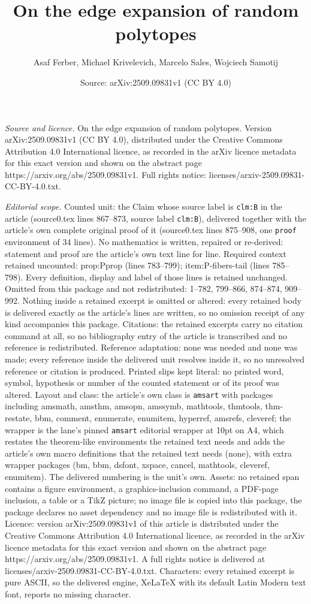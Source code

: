 \documentclass[10pt,a4paper]{amsart}
\title[On the edge expansion of random polytopes]{On the edge expansion of random polytopes}
\author{Asaf Ferber, Michael Krivelevich, Marcelo Sales, Wojciech Samotij}
\date{Source: arXiv:2509.09831v1 (CC BY 4.0)}
\begin{document}
\maketitle

\noindent\emph{Source and licence.} On the edge expansion of random polytopes. Version arXiv:2509.09831v1 (CC BY 4.0), distributed under the Creative Commons Attribution 4.0 International licence, as recorded in the arXiv licence metadata for this exact version and shown on the abstract page https://arxiv.org/abs/2509.09831v1. Full rights notice: licenses/arxiv-2509.09831-CC-BY-4.0.txt.\par\smallskip

\noindent\textit{Editorial scope.} Counted unit: the Claim whose source label is \texttt{clm:B} in the article (source0.tex lines 867--873, source label \texttt{clm:B}), delivered together with the article's own complete original proof of it (source0.tex lines 875--908, one \texttt{proof} environment of 34 lines). No mathematics is written, repaired or re-derived: statement and proof are the article's own text line for line. Required context retained uncounted: prop:Pprop (lines 783--799); item:P-fibers-tail (lines 785--798). Every definition, display and label of those lines is retained unchanged. Omitted from this package and not redistributed: 1--782, 799--866, 874--874, 909--992. Nothing inside a retained excerpt is omitted or altered: every retained body is delivered exactly as the article's lines are written, so no omission receipt of any kind accompanies this package. Citations: the retained excerpts carry no citation command at all, so no bibliography entry of the article is transcribed and no reference is redistributed. Reference adaptation: none was needed and none was made; every reference inside the delivered unit resolves inside it, so no unresolved reference or citation is produced. Printed slips kept literal: no printed word, symbol, hypothesis or number of the counted statement or of its proof was altered. Layout and class: the article's own class is \texttt{amsart} with packages including amsmath, amsthm, amsopn, amssymb, mathtools, thmtools, thm-restate, bbm, comment, enumerate, enumitem, hyperref, amsrefs, cleveref; the wrapper is the lane's pinned \texttt{amsart} editorial wrapper at 10pt on A4, which restates the theorem-like environments the retained text needs and adds the article's own macro definitions that the retained text needs (none), with extra wrapper packages (bm, bbm, dsfont, xspace, cancel, mathtools, cleveref, enumitem). The delivered numbering is the unit's own. Assets: no retained span contains a figure environment, a graphics-inclusion command, a PDF-page inclusion, a table or a TikZ picture; no image file is copied into this package, the package declares no asset dependency and no image file is redistributed with it. Licence: version arXiv:2509.09831v1 of this article is distributed under the Creative Commons Attribution 4.0 International licence, as recorded in the arXiv licence metadata for this exact version and shown on the abstract page https://arxiv.org/abs/2509.09831v1. A full rights notice is delivered at licenses/arxiv-2509.09831-CC-BY-4.0.txt. Characters: every retained excerpt is pure ASCII, so the delivered engine, XeLaTeX with its default Latin Modern text font, reports no missing character.
\end{document}
